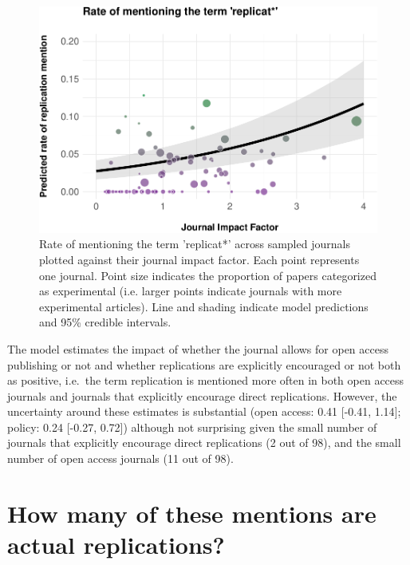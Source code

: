 \documentclass[]{elsarticle} %
\begin{document}
\begin{figure}

{\centering \includegraphics[width=1\linewidth]{ReplicationLing_files/figure-latex/plot_mention_jif-1} 

}

\caption{Rate of mentioning the term 'replicat*' across sampled journals plotted against their journal impact factor. Each point represents one journal. Point size indicates the proportion of papers categorized as experimental (i.e. larger points indicate journals with more experimental articles). Line and shading indicate model predictions and 95\% credible intervals.}\label{fig:plot_mention_jif}
\end{figure}

The model estimates the impact of whether the journal allows for open
access publishing or not and whether replications are explicitly
encouraged or not both as positive, i.e.~the term replication is
mentioned more often in both open access journals and journals that
explicitly encourage direct replications. However, the uncertainty
around these estimates is substantial (open access: 0.41 {[}-0.41,
1.14{]}; policy: 0.24 {[}-0.27, 0.72{]}) although not surprising given
the small number of journals that explicitly encourage direct
replications (2 out of 98), and the small number of open access journals
(11 out of 98).

\hypertarget{how-many-of-these-mentions-are-actual-replications}{%
\section{How many of these mentions are actual
replications?}\label{how-many-of-these-mentions-are-actual-replications}}
\end{document}
